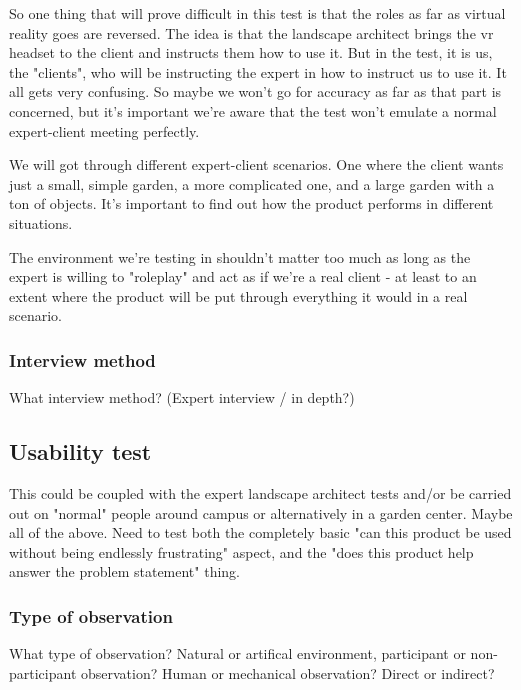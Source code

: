 So one thing that will prove difficult in this test is that the roles as far as virtual reality goes are reversed. The idea is that the landscape architect brings the vr headset to the client and instructs them how to use it. But in the test, it is us, the "clients", who will be instructing the expert in how to instruct us to use it. It all gets very confusing. So maybe we won't go for accuracy as far as that part is concerned, but it's important we're aware that the test won't emulate a normal expert-client meeting perfectly. 

We will got through different expert-client scenarios. One where the client wants just a small, simple garden, a more complicated one, and a large garden with a ton of objects. It's important to find out how the product performs in different situations. 

The environment we're testing in shouldn't matter too much as long as the expert is willing to "roleplay" and act as if we're a real client - at least to an extent where the product will be put through everything it would in a real scenario. 

 
\subsubsection{Interview method}
What interview method? (Expert interview / in depth?)




\subsection{Usability test}
This could be coupled with the expert landscape architect tests and/or be carried out on "normal" people around campus or alternatively in a garden center. Maybe all of the above. Need to test both the completely basic "can this product be used without being endlessly frustrating" aspect, and the "does this product help answer the problem statement" thing.
\subsubsection{Type of observation}
What type of observation? Natural or artifical environment, participant or non-participant observation?
Human or mechanical observation? Direct or indirect?

